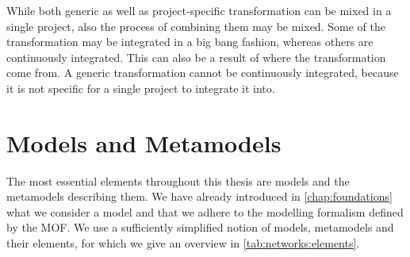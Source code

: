 While both generic as well as project-specific transformation can be mixed in a single project, also the process of combining them may be mixed.
Some of the transformation may be integrated in a big bang fashion, whereas others are continuously integrated.
This can also be a result of where the transformation come from.
A generic transformation cannot be continuously integrated, because it is not specific for a single project to integrate it into.



\section{Models and Metamodels}

The most essential elements throughout this thesis are models and the metamodels describing them.
We have already introduced in \autoref{chap:foundations} what we consider a model and that we adhere to the modelling formalism defined by the \gls{MOF}.
We use a sufficiently simplified notion of models, metamodels and their elements, for which we give an overview in \autoref{tab:networks:elements}.


